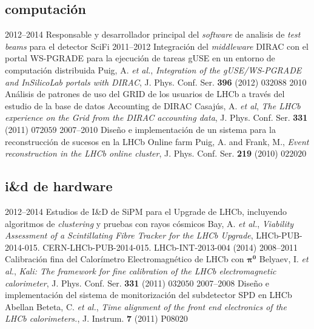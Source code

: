 \subsection{computación}
    \cventry
    {2012--2014}
    {Responsable y desarrollador principal del \emph{software} de analisis de \emph{test beams} para el detector SciFi}
    {}
    {}
    \cventry
    {2011--2012}
    {Integración del \emph{middleware} DIRAC con el portal WS-PGRADE para la ejecución de tareas gUSE en un entorno de computación distribuida}
    {}
    {Puig, A. \emph{et al.}, \textit{Integration of the gUSE/WS-PGRADE and InSilicoLab portals with DIRAC}, J. Phys. Conf. Ser. \textbf{396} (2012) $032088$}
    \cventry
    {2010}
    {Análisis de patrones de uso del GRID de los usuarios de LHCb a través del estudio de la base de datos Accounting de DIRAC}
    {}
    {Casaj{\'u}s, A. \emph{et al}, \textit{The LHCb experience on the Grid from the DIRAC accounting data}, J. Phys. Conf. Ser. \textbf{331} (2011) $072059$}
    \cventry
    {2007--2010}
    {Diseño e implementación de un sistema para la reconstrucción de sucesos en la LHCb Online farm}
    {}
    {Puig, A. and Frank, M., \textit{Event reconstruction in the LHCb online cluster}, J. Phys. Conf. Ser. \textbf{219} (2010) $022020$}

\subsection{i\&d de hardware}
    \cventry
    {2012--2014}
    {Estudios de I\&D de SiPM para el Upgrade de LHCb, incluyendo algoritmos de \emph{clustering} y pruebas con rayos cósmicos}
    {}
    {Bay, A. \emph{et al.}, \textit{Viability Assessment of a Scintillating Fibre Tracker for the LHCb Upgrade}, LHCb-PUB-2014-015. CERN-LHCb-PUB-2014-015. LHCb-INT-2013-004 (2014)}
    \cventry
    {2008--2011}
    {Calibración fina del Calorímetro Electromagnético de LHCb con $\mathbf{\pi^0}$}
    {}
    {Belyaev, I. \emph{et al.}, \textit{Kali: The framework for fine calibration of the LHCb electromagnetic calorimeter}, J. Phys. Conf. Ser. \textbf{331} (2011) $032050$}
    \cventry
    {2007--2008}
    {Diseño e implementación del sistema de monitorización del subdetector SPD en LHCb}
    {}
    {Abellan Beteta, C. \emph{et al.}, \textit{Time alignment of the front end electronics of the LHCb calorimeters.}, J. Instrum. \textbf{7} (2011) P$08020$}

